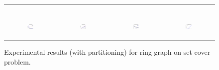 \begin{figure}[ht]
\begin{tabular}{cccc}
\begin{subfigure}[h]{0.22\textwidth}
			\label{appfig:partition:validated_CC2G_ring_setcover}
	  \end{subfigure} \\
	  \begin{subfigure}[h]{0.22\textwidth}
	  	\includegraphics[width=110pt]{images_partition/runtime_ring_maxgraphcut.pdf}
			\caption{}
			\label{appfig:partition:runtime_ring_maxgraphcut}
	  \end{subfigure} &
	  \begin{subfigure}[h]{0.22\textwidth}
	  	\includegraphics[width=110pt]{images_partition/speedup_ring_maxgraphcut.pdf}
			\caption{}
			\label{appfig:partition:speedup_ring_maxgraphcut}
	  \end{subfigure} &
	  \begin{subfigure}[h]{0.22\textwidth}
	  	\includegraphics[width=110pt]{images_partition/diffFA_CF2G_ring_maxgraphcut.pdf}
			\caption{}
			\label{appfig:partition:diffFA_CF2G_ring_maxgraphcut}
	  \end{subfigure} &
	  \begin{subfigure}[h]{0.22\textwidth}
	  	\includegraphics[width=110pt]{images_partition/validated_CC2G_ring_maxgraphcut.pdf}
			\caption{}
			\label{appfig:partition:validated_CC2G_ring_maxgraphcut.pdf}
	  \end{subfigure} \\
  \end{tabular}
  \caption{\footnotesize Experimental results (with partitioning) for ring graph on set cover problem.}
\label{appfig:partition:results_adversarial}
\end{figure}

~
